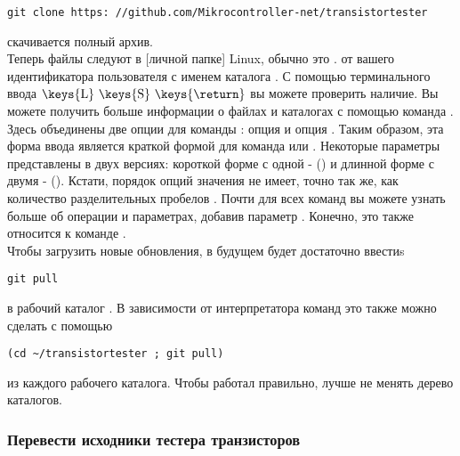\begin{large} \vspace{-0.4em} \begin{verbatim}
git clone https: //github.com/Mikrocontroller-net/transistortester
\end{verbatim} \end{large}
скачивается полный архив. \\
Теперь файлы следуют в [личной папке] Linux, обычно это .
от вашего идентификатора пользователя с именем каталога .
С помощью терминального ввода  \(\mbox{\keys{L} \keys{S} \keys{\return}} \) вы можете
проверить наличие.
Вы можете получить больше информации о файлах и каталогах с помощью
команда . 
Здесь объединены две опции для команды : опция  и опция .
Таким образом, эта форма ввода является краткой формой для
команда  или .
Некоторые параметры представлены в двух версиях: короткой форме с одной - () и длинной
форме с двумя - ().
Кстати, порядок опций значения не имеет,
точно так же, как количество разделительных пробелов \keys{\space}.
Почти для всех команд вы можете узнать больше об операции и параметрах, добавив параметр .
Конечно, это также относится к команде . \\
Чтобы загрузить новые обновления, в будущем будет достаточно ввестиs
\begin{large} \vspace{-0.4em} \begin{verbatim}
git pull
\end{verbatim} \end{large}
в рабочий каталог . 
В зависимости от интерпретатора команд это также можно сделать с помощью
\begin{large} \vspace{-0.4em} \begin{verbatim}
(cd ~/transistortester ; git pull)
\end{verbatim} \end{large}
из каждого рабочего каталога.
Чтобы  работал правильно, лучше не менять дерево каталогов.

\subsubsection{Перевести исходники тестера транзисторов}

